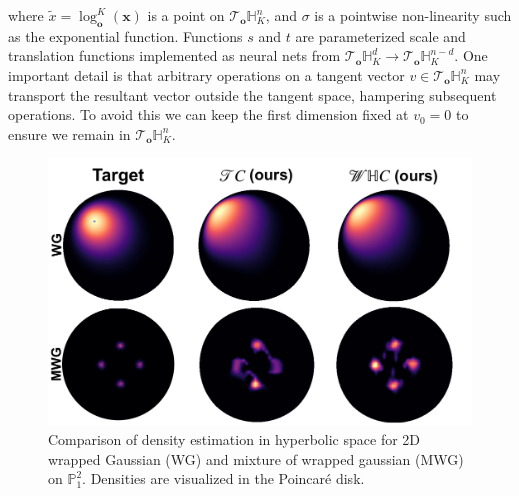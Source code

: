 where $\tilde{x} = \log_{\textbf{o}}^K(\textbf{x})$ is a point on $\mathcal{T}_{\textbf{o}}\mathbb{H}^n_K$, and $\sigma$ is a pointwise non-linearity such as the exponential function. Functions $s$ and $t$ are parameterized scale and translation functions implemented as neural nets from $\mathcal{T}_{\textbf{o}}\mathbb{H}^{d}_K \to \mathcal{T}_{\textbf{o}}\mathbb{H}^{n-d}_K$.
One important detail is that arbitrary operations on a tangent vector $v \in \mathcal{T}_{\textbf{o}}\mathbb{H}^n_K$ may transport the resultant vector outside the tangent space, hampering subsequent operations.
To avoid this we can keep the first dimension fixed at $v_0 = 0$ to ensure we remain in $\mathcal{T}_{\textbf{o}}\mathbb{H}^{n}_K$.

\begin{figure}[t!]
     \centering
     \includegraphics[width=0.95\linewidth]{hyperbolic_density_graphic.pdf}
     \vspace{-10pt}
     \caption{Comparison of density estimation in hyperbolic space for 2D wrapped Gaussian (WG) and mixture of wrapped gaussian (MWG) on $\mathbb{P}^2_1$. Densities are visualized in the Poincar\'e disk.}
     \vspace{-10pt}
     \label{fig:density_estimation}
 \end{figure}

